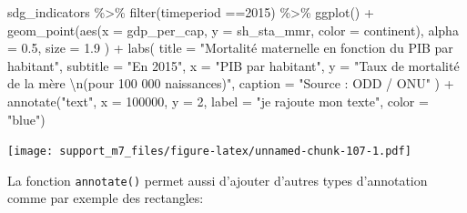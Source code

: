 \documentclass[
]{book}
\newenvironment{Shaded}{\begin{snugshade}}{\end{snugshade}}
\newcommand{\AttributeTok}[1]{\textcolor[rgb]{0.77,0.63,0.00}{#1}}
\newcommand{\DecValTok}[1]{\textcolor[rgb]{0.00,0.00,0.81}{#1}}
\newcommand{\FloatTok}[1]{\textcolor[rgb]{0.00,0.00,0.81}{#1}}
\newcommand{\FunctionTok}[1]{\textcolor[rgb]{0.00,0.00,0.00}{#1}}
\newcommand{\NormalTok}[1]{#1}
\newcommand{\SpecialCharTok}[1]{\textcolor[rgb]{0.00,0.00,0.00}{#1}}
\newcommand{\StringTok}[1]{\textcolor[rgb]{0.31,0.60,0.02}{#1}}
\begin{document}
\begin{Shaded}
\begin{Highlighting}[]
\NormalTok{sdg\_indicators }\SpecialCharTok{\%\textgreater{}\%} 
  \FunctionTok{filter}\NormalTok{(timeperiod }\SpecialCharTok{==}\DecValTok{2015}\NormalTok{) }\SpecialCharTok{\%\textgreater{}\%} 
  \FunctionTok{ggplot}\NormalTok{() }\SpecialCharTok{+}
  \FunctionTok{geom\_point}\NormalTok{(}\FunctionTok{aes}\NormalTok{(}\AttributeTok{x =}\NormalTok{ gdp\_per\_cap, }
                 \AttributeTok{y =}\NormalTok{ sh\_sta\_mmr,}
                 \AttributeTok{color =}\NormalTok{ continent),}
    \AttributeTok{alpha =} \FloatTok{0.5}\NormalTok{, }
    \AttributeTok{size =} \FloatTok{1.9}
\NormalTok{  ) }\SpecialCharTok{+}
  \FunctionTok{labs}\NormalTok{(}
    \AttributeTok{title =} \StringTok{"Mortalité maternelle en fonction du PIB par habitant"}\NormalTok{,}
    \AttributeTok{subtitle =} \StringTok{"En 2015"}\NormalTok{,}
    \AttributeTok{x =} \StringTok{"PIB par habitant"}\NormalTok{,}
    \AttributeTok{y =} \StringTok{"Taux de mortalité de la mère }\SpecialCharTok{\textbackslash{}n}\StringTok{(pour 100 000 naissances)"}\NormalTok{,}
    \AttributeTok{caption =} \StringTok{"Source : ODD / ONU"}
\NormalTok{  ) }\SpecialCharTok{+}
  \FunctionTok{annotate}\NormalTok{(}\StringTok{"text"}\NormalTok{, }\AttributeTok{x =} \DecValTok{100000}\NormalTok{, }\AttributeTok{y =} \DecValTok{2}\NormalTok{, }\AttributeTok{label =} \StringTok{"je rajoute mon texte"}\NormalTok{, }\AttributeTok{color =} \StringTok{"blue"}\NormalTok{)}
\end{Highlighting}
\end{Shaded}

\texttt{[image: support\_m7\_files/figure-latex/unnamed-chunk-107-1.pdf]}

La fonction \texttt{annotate()} permet aussi d'ajouter d'autres types d'annotation comme par exemple des rectangles:
\end{document}
